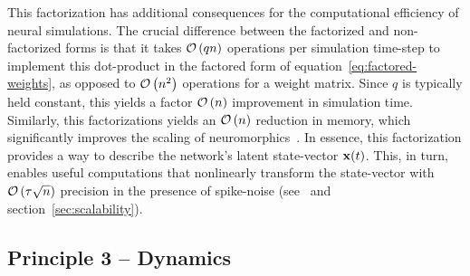This factorization has additional consequences for the computational efficiency of neural simulations.
The crucial difference between the factorized and non-factorized forms is that it takes $\mathcal{O}\left({q n}\right)$ operations per simulation time-step to implement this dot-product in the factored form of equation~\ref{eq:factored-weights}, as opposed to $\mathcal{O}\left({ n^2 }\right)$ operations for a weight matrix.
Since $q$ is typically held constant, this yields a factor $\mathcal{O}\left({ n }\right)$ improvement in simulation time.
Similarly, this factorizations yields an $\mathcal{O}\left({ n }\right)$ reduction in memory, which significantly improves the scaling of neuromorphics~\citep{mundy2015}.
In essence, this factorization provides a way to describe the network's latent state-vector $\mathbf{x}(t)$.
This, in turn, enables useful computations that nonlinearly transform the state-vector with $\mathcal{O}\left({ \tau \sqrt{n} }\right)$ precision in the presence of spike-noise (see~\citet[][p.~47--48]{eliasmith2003a} and section~\ref{sec:scalability}).

\subsection{Principle 3 -- Dynamics}
\label{sec:principle3}

